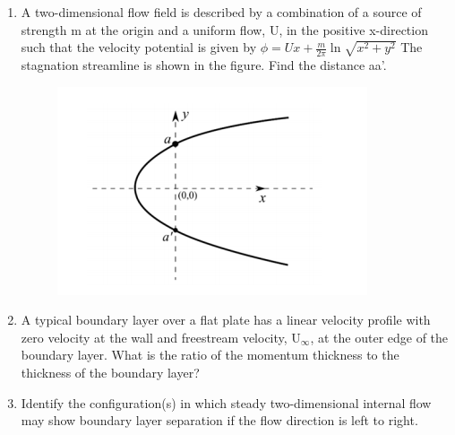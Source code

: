 \documentclass[a4paper,10pt]{article}
\begin{document}
\begin{enumerate}
\item A two-dimensional flow field is described by a combination of a source of strength m at the origin and a uniform flow, U, in the positive x-direction such that the velocity potential is given by
$\phi = Ux + \frac{m}{2\pi} \ln{\sqrt{x^2+y^2}}$
The stagnation streamline is shown in the figure. Find the distance aa'.
\begin{figure}[H]
    \centering
    \includegraphics[width=0.4\columnwidth]{q33.png}
    \caption*{}
    \label{fig:q33}
\end{figure}

\hfill{}
\begin{enumerate}
\end{enumerate}

\item A typical boundary layer over a flat plate has a linear velocity profile with zero velocity at the wall and freestream velocity, U$_\infty$, at the outer edge of the boundary layer. What is the ratio of the momentum thickness to the thickness of the boundary layer?

\hfill{}
\begin{enumerate}
\end{enumerate}

\item Identify the configuration(s) in which steady two-dimensional internal flow may show boundary layer separation if the flow direction is left to right.


\end{enumerate}
\end{document}
